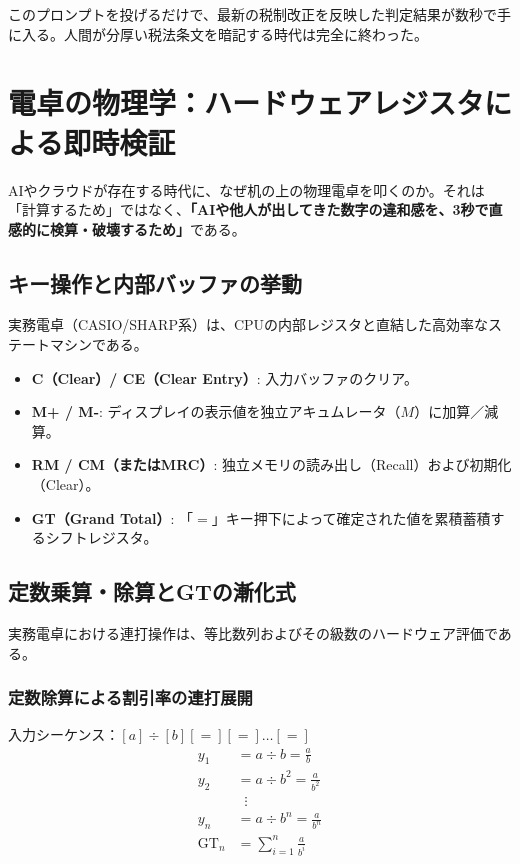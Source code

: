 \documentclass[11pt, a4paper]{report}
\begin{document}
このプロンプトを投げるだけで、最新の税制改正を反映した判定結果が数秒で手に入る。人間が分厚い税法条文を暗記する時代は完全に終わった。

\chapter{電卓の物理学：ハードウェアレジスタによる即時検証}
\label{chap:calculator_physics}

AIやクラウドが存在する時代に、なぜ机の上の物理電卓を叩くのか。それは「計算するため」ではなく、\textbf{「AIや他人が出してきた数字の違和感を、3秒で直感的に検算・破壊するため」}である。

\section{キー操作と内部バッファの挙動}
実務電卓（CASIO/SHARP系）は、CPUの内部レジスタと直結した高効率なステートマシンである。

\begin{itemize}
    \item \textbf{C（Clear）/ CE（Clear Entry）}: 入力バッファのクリア。
    \item \textbf{M+ / M-}: ディスプレイの表示値を独立アキュムレータ（$M$）に加算／減算。
    \item \textbf{RM / CM（またはMRC）}: 独立メモリの読み出し（Recall）および初期化（Clear）。
    \item \textbf{GT（Grand Total）}: 「$=$」キー押下によって確定された値を累積蓄積するシフトレジスタ。
\end{itemize}

\section{定数乗算・除算とGTの漸化式}

実務電卓における連打操作は、等比数列およびその級数のハードウェア評価である。

\subsection{定数除算による割引率の連打展開}
入力シーケンス：$[a] \div [b] [=] [=] \dots [=]$
\begin{align}
    y_1 &= a \div b = \frac{a}{b} \\
    y_2 &= a \div b^2 = \frac{a}{b^2} \\
    &\;\;\vdots \nonumber \\
    y_n &= a \div b^n = \frac{a}{b^n} \\
    \text{GT}_n &= \sum_{i=1}^n \frac{a}{b^i}
\end{align}
\end{document}
